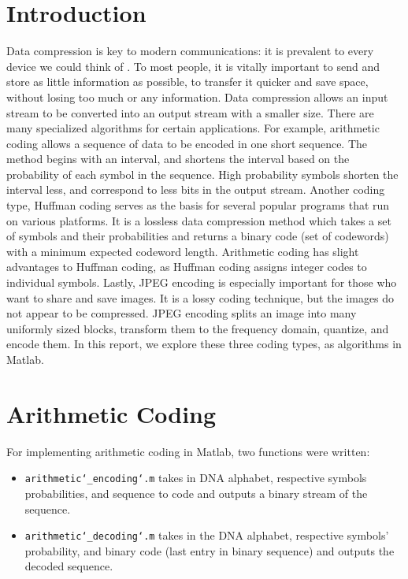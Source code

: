 \documentclass[11pt,a4paper,table]{article}
\begin{document}
\setcounter{page}{2}

\section{Introduction}
Data compression is key to modern communications: it is prevalent to every device we could think of \cite{Salomon2007}. To most people, it is vitally important to send and store as little information as possible, to transfer it quicker and save space, without losing too much or any information. Data compression allows an input stream to be converted into an output stream with a smaller size. There are many specialized algorithms for certain applications. For example, arithmetic coding allows a sequence of data to be encoded in one short sequence. The method begins with an interval, and shortens the interval based on the probability of each symbol in the sequence. High probability symbols shorten the interval less, and correspond to less bits in the output stream. Another coding type, Huffman coding serves as the basis for several popular programs that run on various platforms. It is a lossless data compression method which takes a set of symbols and their probabilities and returns a binary code (set of codewords) with a minimum expected codeword length. Arithmetic coding has slight advantages to Huffman coding, as Huffman coding assigns integer codes to individual symbols. Lastly, JPEG encoding is especially important for those who want to share and save images. It is a lossy coding technique, but the images do not appear to be compressed. JPEG encoding splits an image into many uniformly sized blocks, transform them to the frequency domain, quantize, and encode them. In this report, we explore these three coding types, as algorithms in Matlab.

\section{Arithmetic Coding}
For implementing arithmetic coding in Matlab, two functions were written: 
\begin{itemize}
\item \texttt{arithmetic\char`_encoding\char`.m} takes in DNA alphabet, respective symbols probabilities, and sequence to code and outputs a binary stream of the sequence.
\item \texttt{arithmetic\char`_decoding\char`.m} takes in the DNA alphabet, respective symbols' probability, and binary code (last entry in binary sequence) and outputs the decoded sequence.
\end{itemize}
\end{document}

